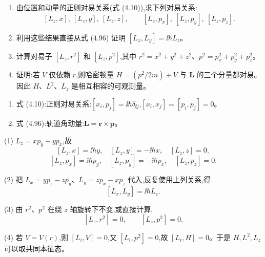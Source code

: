 \begin{question}
\begin{enumerate}
\item 由位置和动量的正则对易关系(式 (4.10)),求下列对易关系:
\[
[L_z,x],\ [L_z,y],\ [L_z,z],\qquad
[L_z,p_x],\ [L_z,p_y],\ [L_z,p_z].
\]
\item 利用这些结果直接从式 (4.96) 证明 $[L_x,L_y]=\ii\hbar L_z$。
\item 计算对易子 $[L_z,r^2]$ 和 $[L_z,p^2]$,其中 $r^2=x^2+y^2+z^2$、$p^2=p_x^2+p_y^2+p_z^2$。
\item 证明:若 $V$ 仅依赖 $r$,则哈密顿量 $H=(p^2/2m)+V$ 与 $\mathbf L$ 的三个分量都对易。因此 $H$、$L^2$、$L_z$ 是相互相容的可观测量。
\end{enumerate}

\par\smallskip
{}
\begin{enumerate}[leftmargin=2.2em,itemsep=0.12em,topsep=0.12em,parsep=0pt]
\item 式 (4.10):正则对易关系:$[x_i,p_j]=\ii\hbar\delta_{\ii j}$,$[x_i,x_j]=[p_i,p_j]=0$。
\item 式 (4.96):轨道角动量:$\mathbf L=\mathbf r\times\mathbf p$。
\end{enumerate}

\begin{solution}

(1) $L_z=xp_y-yp_x$,故
\[
[L_z,x]=\ii\hbar y,
\quad [L_z,y]=-\ii\hbar x,
\quad [L_z,z]=0,
\]
\[
[L_z,p_x]=\ii\hbar p_y,
\quad [L_z,p_y]=-\ii\hbar p_x,
\quad [L_z,p_z]=0.
\]

(2) 把 $L_x=yp_z-zp_y$、$L_y=zp_x-xp_z$ 代入,反复使用上列关系,得
\[
[L_x,L_y]=\ii\hbar L_z.
\]

(3) 由 $r^2$、$p^2$ 在绕 $z$ 轴旋转下不变,或直接计算,
\[
[L_z,r^2]=0,
\qquad [L_z,p^2]=0.
\]

(4) 若 $V=V(r)$,则 $[L_i,V]=0$,又 $[L_i,p^2]=0$,故 $[L_i,H]=0$。于是 $H,L^2,L_z$ 可以取共同本征态。

\end{solution}
\end{question}

